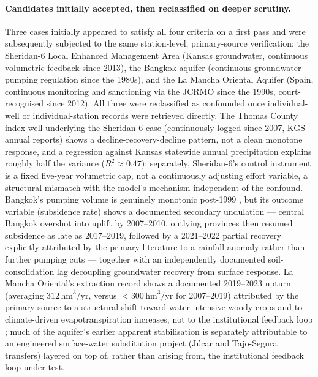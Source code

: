 \documentclass[twocolumn,10pt]{article}
\begin{document}
\paragraph{Candidates initially accepted, then reclassified on deeper scrutiny.} Three cases initially appeared to satisfy all four criteria on a first pass and were subsequently subjected to the same station-level, primary-source verification: the Sheridan-6 Local Enhanced Management Area (Kansas groundwater, continuous volumetric feedback since 2013), the Bangkok aquifer (continuous groundwater-pumping regulation since the 1980s), and the La Mancha Oriental Aquifer (Spain, continuous monitoring and sanctioning via the JCRMO since the 1990s, court-recognised since 2012). All three were reclassified as confounded once individual-well or individual-station records were retrieved directly. The Thomas County index well underlying the Sheridan-6 case (continuously logged since 2007, KGS annual reports) shows a decline-recovery-decline pattern, not a clean monotone response, and a regression against Kansas statewide annual precipitation explains roughly half the variance ($R^2\approx0.47$); separately, Sheridan-6's control instrument is a fixed five-year volumetric cap, not a continuously adjusting effort variable, a structural mismatch with the model's mechanism independent of the confound. Bangkok's pumping volume is genuinely monotonic post-1999 \cite{bremard2022}, but its outcome variable (subsidence rate) shows a documented secondary undulation --- central Bangkok overshot into uplift by 2007--2010, outlying provinces then resumed subsidence as late as 2017--2019, followed by a 2021--2022 partial recovery explicitly attributed by the primary literature to a rainfall anomaly rather than further pumping cuts \cite{ahmed2024} --- together with an independently documented soil-consolidation lag decoupling groundwater recovery from surface response. La Mancha Oriental's extraction record shows a documented 2019--2023 upturn (averaging $312\,\text{hm}^3/\text{yr}$, versus $<300\,\text{hm}^3/\text{yr}$ for 2007--2019) attributed by the primary source to a structural shift toward water-intensive woody crops and to climate-driven evapotranspiration increases, not to the institutional feedback loop \cite{hoogesteger2025}; much of the aquifer's earlier apparent stabilisation is separately attributable to an engineered surface-water substitution project (Júcar and Tajo-Segura transfers) layered on top of, rather than arising from, the institutional feedback loop under test.
\end{document}
